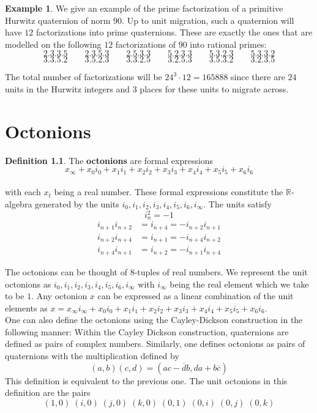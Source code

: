 \documentclass[11pt]{report}
\theoremstyle{plain}
\theoremstyle{definition}
\newtheorem{defn}{Definition}
\newtheorem{exmp}{Example} %
\begin{document}
\begin{exmp}
We give an example of the prime factorization of a primitive Hurwitz quaternion of norm $ 90. $
Up to unit migration, such a quaternion will have $ 12 $ factorizations into prime quaternions. These are exactly the ones that are modelled on the following $ 12 $ factorizations of $ 90 $ into rational primes: 
$$ 2.3.3.5 \qquad 2.3.5.3 \qquad 2.5.3.3 \qquad 5.2.3.3 \qquad 5.3.2.3 \qquad 5.3.3.2$$
$$ 3.3.5.2 \qquad 3.5.2.3 \qquad 3.3.2.5 \qquad 3.2.5.3 \qquad 3.5.3.2 \qquad 3.2.3.5 $$ 

The total number of factorizations will be $ 24^{3} \cdot 12 = 165888 $ since there are $ 24 $ units in the Hurwitz integers and $ 3 $ places for these units to migrate across.


\end{exmp}

\chapter{Octonions}
\begin{defn}
The \textbf{octonions} are formal expressions $$ x_\infty +x_0 i_0 + x_1 i_1 + x_2 i_2 + x_3 i_3 + x_4 i_4 + x_5 i_5 + x_6 i_6 $$ \\ with each $ x_t $ being a real number. These formal expressions constitute the $ \mathbb{R} $-algebra generated by the units $ i_0, i_1, i_2, i_3, i_4, i_5, i_6, i_\infty $. The units satisfy $$ i_n ^{2} = -1 $$
\begin{align*}
 i_{n+1} i_{n+2} &= i_{n+4}  =- i_{n+2} i_{n+1} \\
 i_{n+2} i_{n+4} &= i_{n+1} =  -i_{n+4} i_{n+2}\\
 i_{n+4} i_{n+1} &= i_{n+2} =  -i_{n+1} i_{n+4}   
\end{align*}
\end{defn}
The octonions can be thought of 8-tuples of real numbers. We represent the unit octonions as $ i_0, i_1, i_2, i_3, i_4, i_5, i_6, i_\infty $ with $ i_\infty  $ being the real element which we take to be $ 1 $.
Any octonion $ x $ can be expressed as a linear combination of the unit elements as $  x = x_\infty i_\infty +x_0 i_0 + x_1 i_1 + x_2 i_2 + x_3 i_3 + x_4 i_4 + x_5 i_5 + x_6 i_6. $\\
One can also define the octonions using the Cayley-Dickson construction in the following manner:
Within the Cayley Dickson construction, quaternions are defined as pairs of complex numbers. Similarly, one defines octonions as pairs of quaternions with the multiplication defined by 
$$ (a,b)(c,d) = (ac - \overline{d}b, da + b\overline{c}) $$
This definition is equivalent to the previous one. The unit octonions in this definition are the pairs $$(1,0) \; (i,0) \; (j,0) \; (k,0) \; (0,1) \; (0,i) \; (0,j) \; (0,k) $$ 
\end{document}
